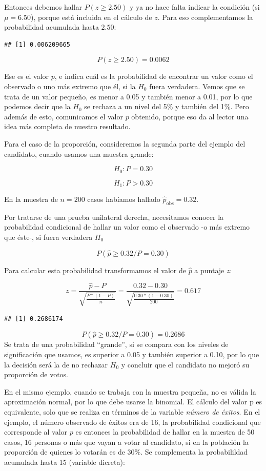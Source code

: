 \documentclass[]{book}
\begin{document}
Entonces debemos hallar \(P( z \geq 2.50 )\) y ya no hace falta
indicar la condición (si \(\mu = 6.50\)), porque está incluida en el
cálculo de \(z\). Para eso complementamos la probabilidad acumulada hasta \(2.50\):

\begin{verbatim}
## [1] 0.006209665
\end{verbatim}

\[P( z \geq 2.50) = 0.0062\]

Ese es el valor \(p\), e indica cuál es la probabilidad de encontrar un
valor como el observado o uno más extremo que él, si la \(H_{0}\) fuera
verdadera. Vemos que se trata de un valor pequeño, es menor a 0.05 y
también menor a 0.01, por lo que podemos decir que la \(H_{0}\) se rechaza a
un nivel del 5\% y también del 1\%. Pero además de esto, comunicamos el
valor \(p\) obtenido, porque eso da al lector una idea más completa de
nuestro resultado.

Para el caso de la proporción, consideremos la segunda parte del ejemplo
del candidato, cuando usamos una muestra grande:

\[H_{0}:P = 0.30\]

\[H_{1}:P > 0.30\]

En la muestra de \(n = 200\) casos habíamos hallado
\({\widehat{p}}_{\text{obs}} = 0.32\).

Por tratarse de una prueba unilateral derecha, necesitamos conocer la
probabilidad condicional de hallar un valor como el observado -o más
extremo que éste-, si fuera verdadera \(H_{0}\)

\[P( \widehat{p} \geq 0.32/P = 0.30)\]

Para calcular esta probabilidad transformamos el valor de \(\widehat{p}\)
a puntaje \(z\):

\[z = \frac{\widehat{p} - P}{\sqrt{\frac{P*(1 - P)}{n}}} = \frac{0.32 - 0.30}{\sqrt{\frac{0.30*(1 - 0.30)}{200}}} = 0.617\]

\begin{verbatim}
## [1] 0.2686174
\end{verbatim}

\[P( \widehat{p} \geq 0.32/P = 0.30)=0.2686\]
Se trata
de una probabilidad ``grande'', si se compara con los niveles de
significación que usamos, es superior a 0.05 y también superior a 0.10,
por lo que la decisión será la de no rechazar \(H_{0}\) y concluir que el
candidato no mejoró su proporción de votos.

En el mismo ejemplo, cuando se trabaja con la muestra pequeña, no es
válida la aproximación normal, por lo que debe usarse la binomial. El
cálculo del valor p es equivalente, solo que se realiza en términos de
la variable \emph{número de éxitos}. En el ejemplo, el número observado de
éxitos era de 16, la probabilidad condicional que corresponde al valor \(p\) es entonces la probabilidad de hallar en la muestra de 50 casos, 16
personas o más que vayan a votar al candidato, si en la población la
proporción de quienes lo votarán es de 30\%. Se complementa la probabilildad acumulada hasta 15 (variable dicreta):
\end{document}
